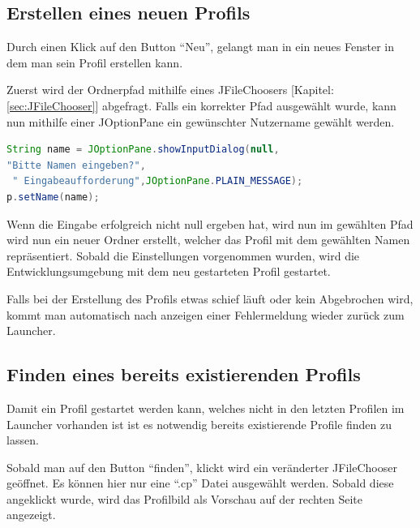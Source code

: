 \subsection{Erstellen eines neuen Profils}
Durch einen Klick auf den Button “Neu”, gelangt man in ein neues Fenster in dem man sein Profil erstellen kann.  

Zuerst wird der Ordnerpfad mithilfe eines JFileChoosers [Kapitel: \ref{sec:JFileChooser}] abgefragt. Falls ein korrekter Pfad ausgewählt wurde, kann nun mithilfe einer JOptionPane ein gewünschter Nutzername gewählt werden. 
\begin{lstlisting}[language=JAVA]
String name = JOptionPane.showInputDialog(null,
"Bitte Namen eingeben?",
 " Eingabeaufforderung",JOptionPane.PLAIN_MESSAGE);
p.setName(name);
\end{lstlisting}

Wenn die Eingabe erfolgreich nicht null ergeben hat, wird nun im gewählten Pfad wird nun ein neuer Ordner erstellt, welcher das Profil mit dem gewählten Namen repräsentiert. Sobald die Einstellungen vorgenommen wurden, wird die Entwicklungsumgebung mit dem neu gestarteten Profil gestartet.

Falls bei der Erstellung des Profils etwas schief läuft oder kein Abgebrochen wird, kommt man automatisch nach anzeigen einer Fehlermeldung wieder zurück zum Launcher.

\subsection{Finden eines bereits existierenden Profils}
Damit ein Profil gestartet werden kann, welches nicht in den letzten Profilen im Launcher vorhanden ist ist es notwendig bereits existierende Profile finden zu lassen.

Sobald man auf den Button “finden”, klickt wird ein veränderter JFileChooser geöffnet. Es können hier nur eine “.cp” Datei ausgewählt werden. Sobald diese angeklickt wurde, wird das Profilbild als Vorschau auf der rechten Seite angezeigt.

